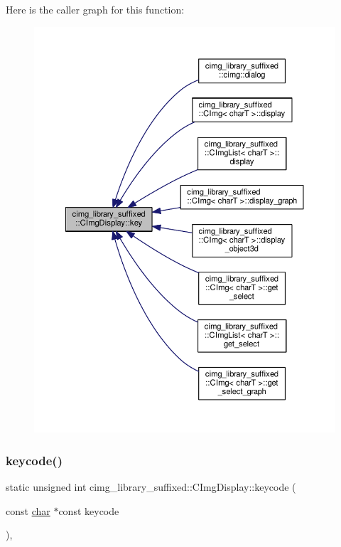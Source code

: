 Here is the caller graph for this function\+:
\nopagebreak
\begin{figure}[H]
\begin{center}
\leavevmode
\includegraphics[width=350pt]{d5/d53/structcimg__library__suffixed_1_1CImgDisplay_a8eb7cd4bd6e6593689f82d157caf3ec1_icgraph}
\end{center}
\end{figure}
\mbox{\label{structcimg__library__suffixed_1_1CImgDisplay_a09c59cb4778b64e31884fccca321839b}} 
\subsubsection{\texorpdfstring{keycode()}{keycode()}}
{\footnotesize\ttfamily static unsigned int cimg\+\_\+library\+\_\+suffixed\+::\+C\+Img\+Display\+::keycode (\begin{DoxyParamCaption}\item[{const \hyperlink{classchar}{char} $\ast$const}]{keycode }\end{DoxyParamCaption})\hspace{0.3cm}{\ttfamily [inline]}, {\ttfamily [static]}}



